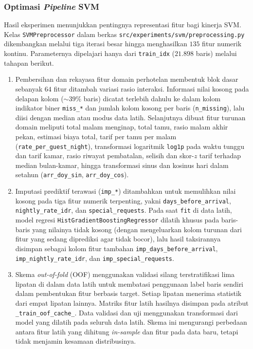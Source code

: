 \subsubsection{Optimasi \textit{Pipeline} SVM}

Hasil eksperimen menunjukkan pentingnya representasi fitur bagi kinerja SVM. Kelas \texttt{SVMPreprocessor} dalam berkas \texttt{src/experiments/svm/preprocessing.py} dikembangkan melalui tiga iterasi besar hingga menghasilkan $135$ fitur numerik kontinu. Parameternya dipelajari hanya dari \texttt{train\_idx} ($21.898$ baris) melalui tahapan berikut.
\begin{enumerate}
    \item Pembersihan dan rekayasa fitur domain perhotelan membentuk blok dasar sebanyak $64$ fitur ditambah variasi rasio interaksi. Informasi nilai kosong pada delapan kolom ($\sim 39\%$ baris) dicatat terlebih dahulu ke dalam kolom indikator biner \texttt{miss\_*} dan jumlah kolom kosong per baris (\texttt{n\_missing}), lalu diisi dengan median atau modus data latih. Selanjutnya dibuat fitur turunan domain meliputi total malam menginap, total tamu, rasio malam akhir pekan, estimasi biaya total, tarif per tamu per malam (\texttt{rate\_per\_guest\_night}), transformasi logaritmik \texttt{log1p} pada waktu tunggu dan tarif kamar, rasio riwayat pembatalan, selisih dan skor-$z$ tarif terhadap median bulan-kamar, hingga transformasi sinus dan kosinus hari dalam setahun (\texttt{arr\_doy\_sin}, \texttt{arr\_doy\_cos}).
    \item Imputasi prediktif terawasi (\texttt{imp\_*}) ditambahkan untuk memulihkan nilai kosong pada tiga fitur numerik terpenting, yakni \texttt{days\_before\_arrival}, \texttt{nightly\_rate\_idr}, dan \texttt{special\_requests}. Pada saat \texttt{fit} di data latih, model regresi \texttt{HistGradientBoostingRegressor} dilatih khusus pada baris-baris yang nilainya tidak kosong (dengan mengeluarkan kolom turunan dari fitur yang sedang diprediksi agar tidak bocor), lalu hasil taksirannya disimpan sebagai kolom fitur tambahan \texttt{imp\_days\_before\_arrival}, \texttt{imp\_nightly\_rate\_idr}, dan \texttt{imp\_special\_requests}.
    \item Skema \textit{out-of-fold} (OOF) menggunakan validasi silang terstratifikasi lima lipatan di dalam data latih untuk membatasi penggunaan label baris sendiri dalam pembentukan fitur berbasis target. Setiap lipatan menerima statistik dari empat lipatan lainnya. Matriks fitur latih hasilnya disimpan pada atribut \texttt{\_train\_oof\_cache\_}. Data validasi dan uji menggunakan transformasi dari model yang dilatih pada seluruh data latih. Skema ini mengurangi perbedaan antara fitur latih yang dihitung \textit{in-sample} dan fitur pada data baru, tetapi tidak menjamin kesamaan distribusinya.

\end{enumerate}
